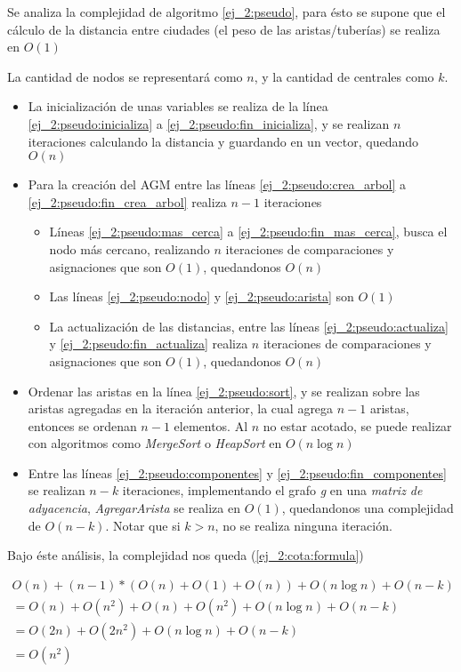 Se analiza la complejidad de algoritmo \ref{ej_2:pseudo}, para \'esto se supone que el c\'alculo de la distancia entre ciudades (el peso de las aristas/tuber\'ias) se realiza en $O(1)$

La cantidad de nodos se representar\'a como $n$, y la cantidad de centrales como $k$.

\begin{itemize}
	\item La inicializaci\'on de unas variables se realiza de la l\'inea \ref{ej_2:pseudo:inicializa} a \ref{ej_2:pseudo:fin_inicializa}, y se realizan $n$ iteraciones calculando la distancia y guardando en un vector, quedando $O(n)$
	\item Para la creaci\'on del AGM entre las l\'ineas \ref{ej_2:pseudo:crea_arbol} a \ref{ej_2:pseudo:fin_crea_arbol} realiza $n - 1$ iteraciones
	\begin{itemize}
		\item L\'ineas \ref{ej_2:pseudo:mas_cerca} a \ref{ej_2:pseudo:fin_mas_cerca}, busca el nodo m\'as cercano, realizando $n$ iteraciones de comparaciones y asignaciones que son $O(1)$, quedandonos $O(n)$
		\item Las l\'ineas \ref{ej_2:pseudo:nodo} y \ref{ej_2:pseudo:arista} son $O(1)$
		\item La actualizaci\'on de las distancias, entre las l\'ineas \ref{ej_2:pseudo:actualiza} y \ref{ej_2:pseudo:fin_actualiza} realiza $n$ iteraciones de comparaciones y asignaciones que son $O(1)$, quedandonos $O(n)$
	\end{itemize}
	\item Ordenar las aristas en la l\'inea \ref{ej_2:pseudo:sort}, y se realizan sobre las aristas agregadas en la iteraci\'on anterior, la cual agrega $n-1$ aristas, entonces se ordenan $n - 1$ elementos. Al $n$ no estar acotado, se puede realizar con algoritmos como \emph{MergeSort} o \emph{HeapSort} en $O(n \log n)$
	\item Entre las l\'ineas \ref{ej_2:pseudo:componentes} y \ref{ej_2:pseudo:fin_componentes} se realizan $n - k$ iteraciones, implementando el grafo \emph{g} en una \emph{matriz de adyacencia}, \emph{AgregarArista} se realiza en $O(1)$, quedandonos una complejidad de $O(n - k)$. Notar que si $k > n$, no se realiza ninguna iteraci\'on.
\end{itemize}

Bajo \'este an\'alisis, la complejidad nos queda (\ref{ej_2:cota:formula})

\begin{equation}
\label{ej_2:cota:formula}
\begin{split}
O(n) + (n-1)*(O(n) + O(1) + O(n)) + O(n \log n) + O(n - k) \\
=
O(n) + O(n^2) + O(n) + O(n^2) + O(n \log n) + O(n - k) \\
=
O(2n) + O(2n^2) + O(n \log n) + O(n - k) \\
= O(n^2)
\end{split}
\end{equation}

